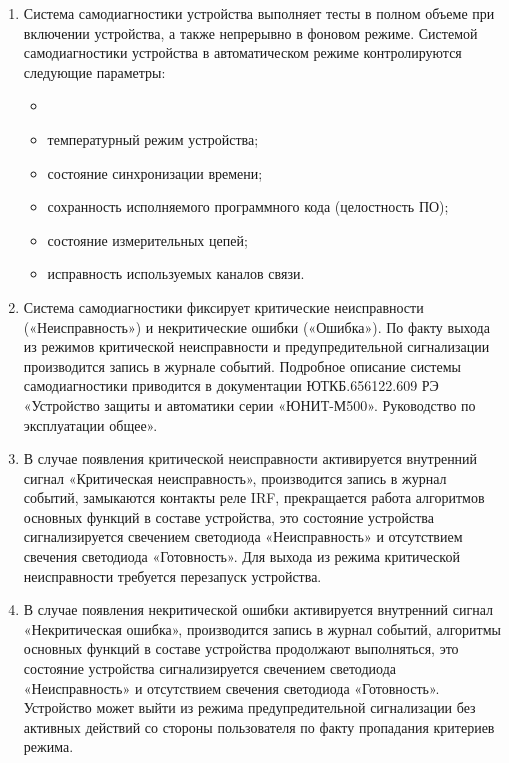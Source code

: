 \begin{enumerate}[label=\arabic{section}.\arabic{subsection}.\arabic*, labelsep=4pt, leftmargin=0pt, itemindent=57pt]

\item
Система самодиагностики устройства выполняет тесты в полном объеме при включении устройства, а также непрерывно в фоновом режиме.
Системой самодиагностики устройства в автоматическом режиме контролируются следующие параметры:
\begin{itemize}
\item {}
\item температурный режим устройства;
\item состояние синхронизации времени;
\item сохранность исполняемого программного кода (целостность ПО);
\item состояние измерительных цепей;
\item исправность используемых каналов связи.
\end{itemize}

\item
Система самодиагностики фиксирует критические неисправности («Неисправность») и некритические ошибки («Ошибка»).
По факту выхода из режимов критической неисправности и предупредительной сигнализации производится запись в журнале событий.
Подробное описание системы самодиагностики приводится в документации {\color{red}ЮТКБ.656122.609 РЭ} «Устройство защиты и автоматики серии «ЮНИТ-М500». Руководство по эксплуатации общее».

\item
В случае появления критической неисправности активируется внутренний сигнал «Критическая неисправность», производится запись в журнал событий, замыкаются контакты реле IRF, прекращается работа алгоритмов основных функций в составе устройства, это состояние устройства сигнализируется свечением светодиода «Неисправность» и отсутствием свечения светодиода «Готовность».
Для выхода из режима критической неисправности требуется перезапуск устройства.

\item
В случае появления некритической ошибки активируется внутренний сигнал «Некритическая ошибка», производится запись в журнал событий, алгоритмы основных функций в составе устройства продолжают выполняться, это состояние устройства сигнализируется свечением светодиода «Неисправность» и отсутствием свечения светодиода «Готовность».
Устройство может выйти из режима предупредительной сигнализации без активных действий со стороны пользователя по факту пропадания критериев режима.

\end{enumerate}


